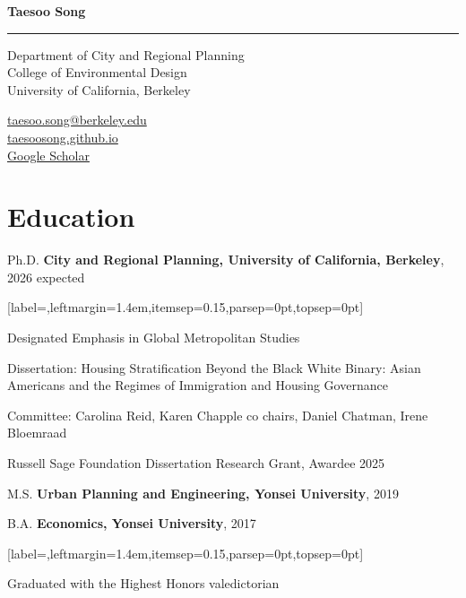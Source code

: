 \documentclass[11pt,letterpaper]{article}
\newcommand{\listitemspace}{0.25em}
\renewenvironment{itemize}
{\begin{list}{}{\setlength{\leftmargin}{1em}
\setlength{\parskip}{0pt}
\setlength{\itemsep}{\listitemspace}
\setlength{\parsep}{\listitemspace}}}
{\end{list}}
\newcommand{\namefont}[1]{{\normalfont\bfseries\Huge #1}}
\newenvironment{subpoints}{%
  \begin{itemize}[label={},leftmargin=1.4em,itemsep=0.15\baselineskip,parsep=0pt,topsep=0pt]}%
  {\end{itemize}}
\begin{document}
\raggedright

\namefont{Taesoo Song}
\noindent\rule{\linewidth}{0.8pt}

\begin{minipage}[t]{0.66\textwidth}
Department of City and Regional Planning\\
College of Environmental Design\\
University of California, Berkeley
\end{minipage}
\begin{minipage}[t]{0.33\textwidth}
\raggedleft
\href{mailto:taesoo.song@berkeley.edu}{taesoo.song@berkeley.edu}\\
\href{https://taesoosong.github.io}{taesoosong.github.io}\\
\href{https://scholar.google.com/citations?user=xM5Rc-EAAAAJ}{Google Scholar}
\end{minipage}

\section{Education}
\begin{tablist}
  \item[Ph.D.] \tab{}\textbf{City and Regional Planning, University of California, Berkeley}, 2026 expected
    \begin{subpoints}
      \item Designated Emphasis in Global Metropolitan Studies
      \item Dissertation: Housing Stratification Beyond the Black White Binary: Asian Americans and the Regimes of Immigration and Housing Governance
      \item Committee: Carolina Reid, Karen Chapple co chairs, Daniel Chatman, Irene Bloemraad
      \item Russell Sage Foundation Dissertation Research Grant, Awardee 2025
    \end{subpoints}

  \item[M.S.] \tab{}\textbf{Urban Planning and Engineering, Yonsei University}, 2019

  \item[B.A.] \tab{}\textbf{Economics, Yonsei University}, 2017
    \begin{subpoints}
      \item Graduated with the Highest Honors valedictorian
    \end{subpoints}
\end{tablist}
\end{document}
